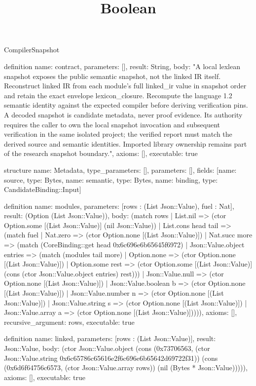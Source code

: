 \begin{lexlean}{CompilerSnapshot}
\title{Boolean}
\begin{semanticmodule}

definition{
 name: contract,
 parameters: [],
 result: String,
 body: "A local lexlean snapshot exposes the public semantic snapshot, not the linked IR itself. Reconstruct linked IR from each module's full linked_ir value in snapshot order and retain the exact envelope lexicon_closure. Recompute the language 1.2 semantic identity against the expected compiler before deriving verification pins. A decoded snapshot is candidate metadata, never proof evidence. Its authority requires the caller to own the local snapshot invocation and subsequent verification in the same isolated project; the verified report must match the derived source and semantic identities. Imported library ownership remains part of the research snapshot boundary.",
 axioms: [],
 executable: true
}

structure{
 name: Metadata,
 type_parameters: [],
 parameters: [],
 fields: [{name: source, type: Bytes}, {name: semantic, type: Bytes}, {name: binding, type: CandidateBinding::Input}]
}

definition{
 name: modules,
 parameters: [rows : (List Json::Value), fuel : Nat],
 result: (Option (List Json::Value)),
 body: (match rows | List.nil => (ctor Option.some [(List Json::Value)] (nil Json::Value)) | List.cons head tail => (match fuel | Nat.zero => (ctor Option.none [(List Json::Value)]) | Nat.succ more => (match (CoreBinding::get head 0x6c696e6b65645f6972) | Json::Value.object entries => (match (modules tail more) | Option.none => (ctor Option.none [(List Json::Value)]) | Option.some rest => (ctor Option.some [(List Json::Value)] (cons (ctor Json::Value.object entries) rest))) | Json::Value.null => (ctor Option.none [(List Json::Value)]) | Json::Value.boolean b => (ctor Option.none [(List Json::Value)]) | Json::Value.number n => (ctor Option.none [(List Json::Value)]) | Json::Value.string s => (ctor Option.none [(List Json::Value)]) | Json::Value.array a => (ctor Option.none [(List Json::Value)])))),
 axioms: [],
 recursive_argument: rows,
 executable: true
}

definition{
 name: linked,
 parameters: [rows : (List Json::Value)],
 result: Json::Value,
 body: (ctor Json::Value.object (cons (0x73706563, (ctor Json::Value.string 0x6c65786c65616e2f6c696e6b65642d69722f31)) (cons (0x6d6f64756c6573, (ctor Json::Value.array rows)) (nil (Bytes * Json::Value))))),
 axioms: [],
 executable: true
}


\end{semanticmodule}
\end{lexlean}

